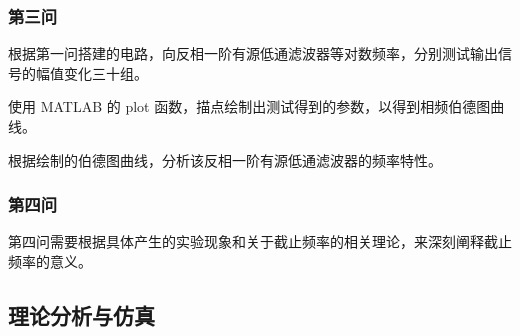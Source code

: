 \documentclass[./测控三级项目.tex]{subfiles} %
\begin{document}
		\subsubsection{第三问}
			根据第一问搭建的电路，向反相一阶有源低通滤波器等对数频率，分别测试输出信号的幅值变化三十组。\par 
			使用 MATLAB 的 plot 函数，描点绘制出测试得到的参数，以得到相频伯德图曲线。 \par
			根据绘制的伯德图曲线，分析该反相一阶有源低通滤波器的频率特性。
		\subsubsection{第四问}
			第四问需要根据具体产生的实验现象和关于截止频率的相关理论，来深刻阐释截止频率的意义。
			
			
			
			
	\subsection{理论分析与仿真}
\end{document}
